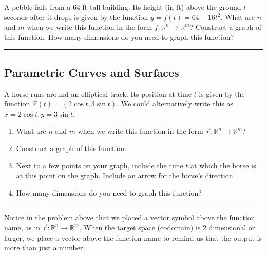 \begin{problem}\label{pebble problem}%
%
A pebble falls from a 64 ft tall building.  Its height (in ft) above the ground $t$ seconds after it drops is given by the function $y=f(t)=64-16t^2$. What are $n$ and $m$ when we write this function in the form  $f:{\mathbb{R}}^n\to {\mathbb{R}}^m$? Construct a graph of this function.  How many dimensions do you need to graph this function?
\hrule\end{problem}

\subsection{Parametric Curves and Surfaces}

\begin{problem}\label{parametric curve in plane example}%
%
A horse runs around an elliptical track. Its position at time $t$ is given by the function $\vec r(t)=(2\cos t, 3\sin t).$ We could alternatively write this as $x=2\cos t, y=3\sin t$. 
 \begin{enumerate}
  \item What are $n$ and $m$ when we write this function in the form  $\vec r:{\mathbb{R}}^n\to {\mathbb{R}}^m$?
  \item Construct a graph of this function. 
  \item Next to a few points on your graph, include the time $t$ at which the horse is at this point on the graph. Include an arrow for the horse's direction.
  \item How many dimensions do you need to graph this function?
 \end{enumerate}
\hrule\end{problem}


\begin{remark}
Notice in the problem above that we placed a vector symbol above the function name, as in $\vec r:{\mathbb{R}}^n\to {\mathbb{R}}^m$.  When the target space (codomain) is 2 dimensional or larger, we place a vector above the function name to remind us that the output is more than just a number.
\end{remark}

